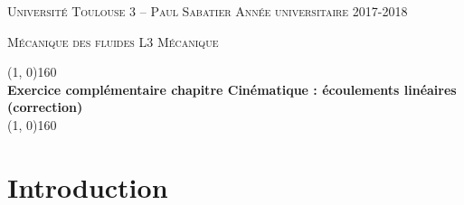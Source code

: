 \documentclass[10pt, a4paper]{article}
\renewcommand{\thickline}[2]{\linethickness{#1} \line(1, 0){#2}}
\begin{document}

\begin{center}

  \textsc{Université Toulouse 3 -- Paul Sabatier \hfill Année universitaire 2017-2018}
  
  \textsc{Mécanique des fluides \hfill L3 Mécanique}
  
  \vspace{0mm}
  
  \begin{center}
    \thickline{0.4mm}{160}
    \\ \vspace{3mm}
  \textbf{\large Exercice complémentaire chapitre Cinématique : écoulements linéaires (correction)}
    \\ %
    \thickline{0.4mm}{160}
  \end{center}

  
\end{center}


\medskip

\section{Introduction}
\end{document}
